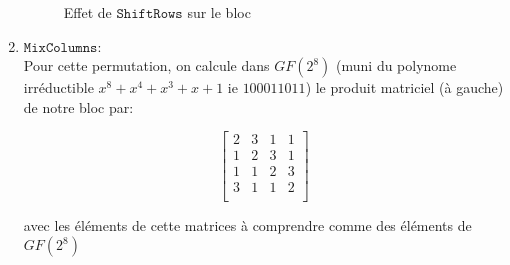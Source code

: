 \documentclass[a4paper, 12pt]{article}
\begin{document}
\begin{enumerate}
		\begin{figure}[H]
		\centering
		\caption{Effet de $\mathtt{ShiftRows}$ sur le bloc}
		\label{illu_shiftrows}
		\end{figure}

	\item $\mathtt{MixColumns}$: \\
		Pour cette permutation, on calcule dans $GF\left(2^8\right)$ (muni du polynome irréductible $x^8 + x^4 + x^3 + x + 1$ ie $100011011$) le produit matriciel (à gauche) de notre bloc par:
		
		$$
		\begin{bmatrix}
			2 & 3 & 1 & 1 \\
			1 & 2 & 3 & 1 \\
			1 & 1 & 2 & 3 \\
			3 & 1 & 1 & 2 \\
		\end{bmatrix}
		$$
		
		avec les éléments de cette matrices à comprendre comme des éléments de $GF\left(2^8\right)$ 
\end{enumerate}
\end{document}
